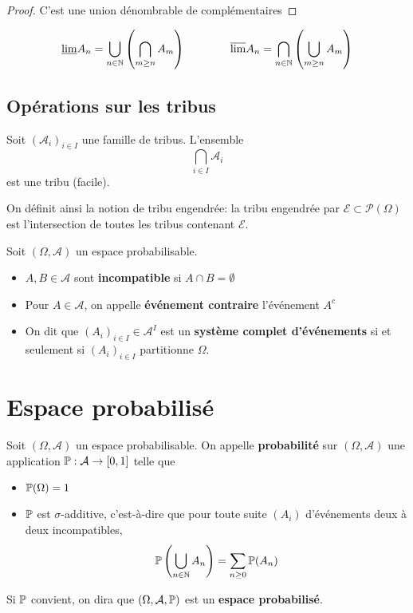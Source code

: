 \begin{proof}
    C'est une union dénombrable de complémentaires
\end{proof}

\begin{notation}[HP]
    \[
        \underline{\lim}A_n=\bigcup_{n\in\N} \left( \bigcap_{m\geq n} A_m \right) \qquad \qquad \overline{\lim} A_n=\bigcap_{n\in\N} \left( \bigcup_{m\geq n}A_m \right) 
    \]
\end{notation}

\subsection{Opérations sur les tribus}

Soit $(\mathcal A_i)_{i\in I}$ une famille de tribus. L'ensemble \[
    \bigcap_{i\in I}\mathcal A_i
\]
est une tribu (facile).

\begin{rem}
    On définit ainsi la notion de tribu engendrée: la tribu engendrée par $\mathcal E\subset \mathcal P(\Omega)$ est l'intersection de toutes les tribus contenant $\mathcal E$.
\end{rem}

\begin{dfn}
    Soit $(\Omega, \mathcal A)$ un espace probabilisable. \begin{itemize}
        \item $A,B\in \mathcal A$ sont \textbf{incompatible} si $A \cap B=\emptyset$
        \item Pour $A\in \mathcal A$, on appelle  \textbf{événement contraire} l'événement $A^c$
        \item On dit que $(A_i)_{i\in I} \in  \mathcal A^I$ est un \textbf{système complet d'événements} si et seulement si $(A_i)_{i\in I}$ partitionne $\Omega$.
    \end{itemize}
\end{dfn}

\section{Espace probabilisé}

\begin{dfn}
    Soit $(\Omega, \mathcal A)$ un espace probabilisable. On appelle \textbf{probabilité} sur $(\Omega, \mathcal A)$ une application $\P:\mathcal A \to  [0, 1]$ telle que \begin{itemize}
        \item $\P(\Omega)=1$
        \item $\P$ est $\sigma$-additive, c'est-à-dire que pour toute suite $(A_i)$ d'événements deux à deux incompatibles, \[
                \P \left( \bigcup_{n\in\N}A_n \right) =\sum_{n\geq 0}\P(A_n)
        \]
    \end{itemize}
    Si $\P$ convient, on dira que $(\Omega, \mathcal A, \P)$ est un \textbf{espace probabilisé}.
\end{dfn}

